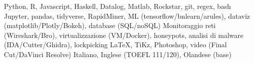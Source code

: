 
\begin{cvskills}
        {Python, R, Javascript, Haskell, Datalog, Matlab, Rockstar, git, regex, bash}
        {Jupyter, pandas, tidyverse, RapidMiner, ML (tensorflow/bnlearn/arules), dataviz (matplotlib/Plotly/Bokeh), database (SQL/noSQL)}
        {Monitoraggio reti (Wireshark/Bro), virtualizzazione (VM/Docker), honeypots, analisi di malware (IDA/Cutter/Ghidra), lockpicking}
        {\LaTeX, TiKz, Photoshop, video (Final Cut/DaVinci Resolve)}
        {Italiano, Inglese (TOEFL 111/120), Olandese (base)}
\end{cvskills}
